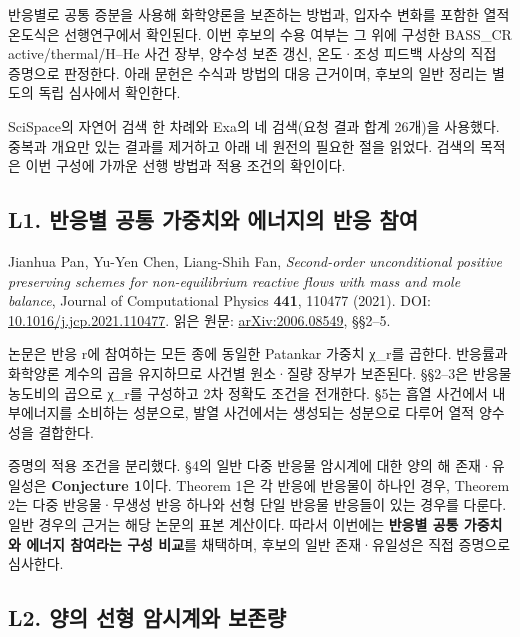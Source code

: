 \documentclass[11pt,a4paper]{article}
\begin{document}
반응별로 공통 증분을 사용해 화학양론을 보존하는 방법과, 입자수 변화를 포함한 열적 온도식은 선행연구에서 확인된다. 이번 후보의 수용 여부는 그 위에 구성한 BASS\_CR active/thermal/H--He 사건 장부, 양수성 보존 갱신, 온도·조성 피드백 사상의 직접 증명으로 판정한다. 아래 문헌은 수식과 방법의 대응 근거이며, 후보의 일반 정리는 별도의 독립 심사에서 확인한다.

SciSpace의 자연어 검색 한 차례와 Exa의 네 검색(요청 결과 합계 26개)을 사용했다. 중복과 개요만 있는 결과를 제거하고 아래 네 원전의 필요한 절을 읽었다. 검색의 목적은 이번 구성에 가까운 선행 방법과 적용 조건의 확인이다.

\hypertarget{l1.-uxbc18uxc751uxbcc4-uxacf5uxd1b5-uxac00uxc911uxce58uxc640-uxc5d0uxb108uxc9c0uxc758-uxbc18uxc751-uxcc38uxc5ec}{%
\subsection{L1. 반응별 공통 가중치와 에너지의 반응 참여}\label{l1.-uxbc18uxc751uxbcc4-uxacf5uxd1b5-uxac00uxc911uxce58uxc640-uxc5d0uxb108uxc9c0uxc758-uxbc18uxc751-uxcc38uxc5ec}}

Jianhua Pan, Yu-Yen Chen, Liang-Shih Fan, \emph{Second-order unconditional positive preserving schemes for non-equilibrium reactive flows with mass and mole balance}, Journal of Computational Physics \textbf{441}, 110477 (2021). DOI: \href{https://doi.org/10.1016/j.jcp.2021.110477}{10.1016/j.jcp.2021.110477}. 읽은 원문: \href{https://ar5iv.labs.arxiv.org/html/2006.08549}{arXiv:2006.08549}, §§2--5.

논문은 반응 r에 참여하는 모든 종에 동일한 Patankar 가중치 χ\_r를 곱한다. 반응률과 화학양론 계수의 곱을 유지하므로 사건별 원소·질량 장부가 보존된다. §§2--3은 반응물 농도비의 곱으로 χ\_r를 구성하고 2차 정확도 조건을 전개한다. §5는 흡열 사건에서 내부에너지를 소비하는 성분으로, 발열 사건에서는 생성되는 성분으로 다루어 열적 양수성을 결합한다.

증명의 적용 조건을 분리했다. §4의 일반 다중 반응물 암시계에 대한 양의 해 존재·유일성은 \textbf{Conjecture 1}이다. Theorem 1은 각 반응에 반응물이 하나인 경우, Theorem 2는 다중 반응물·무생성 반응 하나와 선형 단일 반응물 반응들이 있는 경우를 다룬다. 일반 경우의 근거는 해당 논문의 표본 계산이다. 따라서 이번에는 \textbf{반응별 공통 가중치와 에너지 참여라는 구성 비교}를 채택하며, 후보의 일반 존재·유일성은 직접 증명으로 심사한다.

\hypertarget{l2.-uxc591uxc758-uxc120uxd615-uxc554uxc2dcuxacc4uxc640-uxbcf4uxc874uxb7c9}{%
\subsection{L2. 양의 선형 암시계와 보존량}\label{l2.-uxc591uxc758-uxc120uxd615-uxc554uxc2dcuxacc4uxc640-uxbcf4uxc874uxb7c9}}
\end{document}

